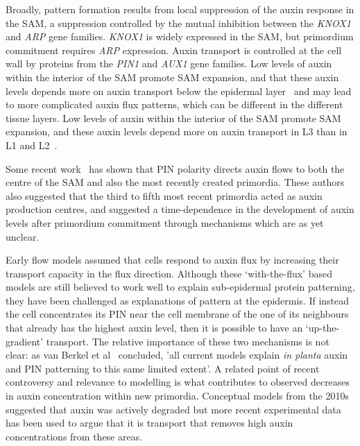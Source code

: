 	 Broadly, pattern formation results from local suppression of the auxin response in the SAM, a suppression controlled by the mutual inhibition between the \textit{KNOX1} and \textit{ARP} gene families. \textit{KNOX1} is widely expressed in the SAM, but primordium commitment requires \textit{ARP} expression. Auxin transport is controlled at the cell wall by proteins from the \textit{PIN1} and \textit{AUX1} gene families.  Low levels of auxin within the interior of the SAM promote SAM expansion, and that these auxin levels depends more on auxin transport below the epidermal layer~\autocite{shiFeedbackLateralOrgans2018} and may lead to more complicated auxin flux patterns, which can be different in the different tissue layers. Low levels of auxin within the interior of the SAM promote SAM expansion, and these auxin levels depend more on auxin transport in L3 than in L1 and L2~\autocite{shiFeedbackLateralOrgans2018,shiPatterningShootApical2019}.


Some recent work~\autocite{galvan-ampudiaTemporalIntegrationAuxin2020} has shown that PIN polarity directs auxin flows to both the centre of the SAM and also the most recently created primordia. These authors also suggested that the third to fifth most recent primordia acted as auxin production centres, and suggested a time-dependence in the  development of auxin levels after primordium commitment through mechanisms which are as yet unclear. 

Early flow models assumed that cells respond to auxin flux by increasing their transport capacity in the flux direction. Although these `with-the-flux' based models are still believed to work well to explain  sub-epidermal protein patterning, they have been challenged as explanations of pattern at the epidermis.  If instead the cell concentrates its PIN near the cell membrane of the one of its neighbours that already has the highest auxin level, then it is possible to 
have an `up-the-gradient' transport. The relative importance of these two mechanisms is  not  clear: as van Berkel et al~\autocite{berkelPolarAuxinTransport2013} concluded, 'all current models explain \textit{in planta} auxin and PIN patterning to this same limited extent'. A related point of recent controversy and relevance to modelling is what contributes to observed decreases in auxin concentration within new primordia. Conceptual models from the 2010s suggested that auxin was actively degraded but more recent experimental data has been used to argue that it is transport that removes high auxin concentrations from these areas.

